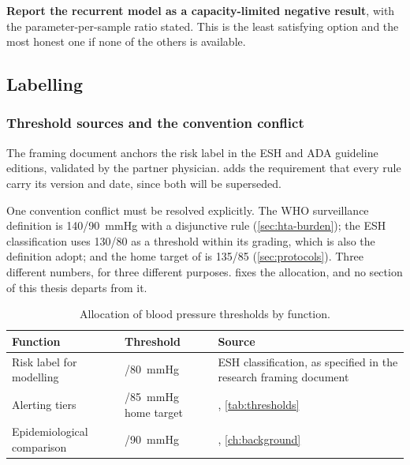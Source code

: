 \documentclass[12pt,a4paper,oneside]{report}
\begin{document}
\textbf{Report the recurrent model as a capacity-limited negative result}, with the parameter-per-sample ratio stated. This is the least satisfying option and the most honest one if none of the others is available.

\subsection{Labelling}\label{sec:labelling}

\subsubsection{Threshold sources and the convention conflict}

The framing document anchors the risk label in the ESH and ADA guideline editions, validated by the partner physician.  adds the requirement that every rule carry its version and date, since both will be superseded.

One convention conflict must be resolved explicitly. The WHO surveillance definition is 140/90~mmHg with a disjunctive rule (\cref{sec:hta-burden}); the ESH classification uses 130/80 as a threshold within its grading, which is also the definition \textcite{mendoza2025} adopt; and the home target of \textcite{mihevc2025} is 135/85 (\cref{sec:protocols}). Three different numbers, for three different purposes.  fixes the allocation, and no section of this thesis departs from it.

\begin{table}[htbp]
\centering\small
\caption{Allocation of blood pressure thresholds by function.}\label{tab:threshold-allocation}
\begin{tabularx}{\textwidth}{@{}>{\raggedright\arraybackslash}p{3.6cm} >{\raggedright\arraybackslash}p{2.6cm} X@{}}
\toprule
\textbf{Function} & \textbf{Threshold} & \textbf{Source} \\
\midrule
Risk label for modelling & 130/80~mmHg & ESH classification, as specified in the research framing document \\
Alerting tiers & 135/85~mmHg home target & \textcite{mihevc2025}, \cref{tab:thresholds} \\
Epidemiological comparison & 140/90~mmHg & \textcite{who2023hypertension}, \cref{ch:background} \\
\bottomrule
\end{tabularx}
\end{table}
\end{document}
